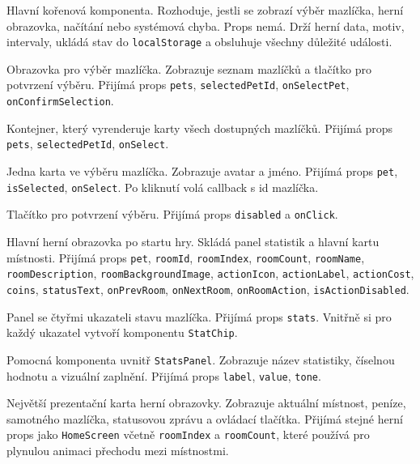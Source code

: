\documentclass[12pt,a4paper]{article}
\begin{document}
\begin{description}[style=nextline]
  \item[\texttt{App}] Hlavní kořenová komponenta. Rozhoduje, jestli se zobrazí výběr mazlíčka, herní obrazovka, načítání nebo systémová chyba. Props nemá. Drží herní data, motiv, intervaly, ukládá stav do \texttt{localStorage} a obsluhuje všechny důležité události.

  \item[\texttt{PetSelectionScreen}] Obrazovka pro výběr mazlíčka. Zobrazuje seznam mazlíčků a tlačítko pro potvrzení výběru. Přijímá props \texttt{pets}, \texttt{selectedPetId}, \texttt{onSelectPet}, \texttt{onConfirmSelection}.

  \item[\texttt{PetSelectionList}] Kontejner, který vyrenderuje karty všech dostupných mazlíčků. Přijímá props \texttt{pets}, \texttt{selectedPetId}, \texttt{onSelect}.

  \item[\texttt{PetOptionCard}] Jedna karta ve výběru mazlíčka. Zobrazuje avatar a jméno. Přijímá props \texttt{pet}, \texttt{isSelected}, \texttt{onSelect}. Po kliknutí volá callback s id mazlíčka.

  \item[\texttt{SelectPetButton}] Tlačítko pro potvrzení výběru. Přijímá props \texttt{disabled} a \texttt{onClick}.

  \item[\texttt{HomeScreen}] Hlavní herní obrazovka po startu hry. Skládá panel statistik a hlavní kartu místnosti. Přijímá props \texttt{pet}, \texttt{roomId}, \texttt{roomIndex}, \texttt{roomCount}, \texttt{roomName}, \texttt{roomDescription}, \texttt{roomBackgroundImage}, \texttt{actionIcon}, \texttt{actionLabel}, \texttt{actionCost}, \texttt{coins}, \texttt{statusText}, \texttt{onPrevRoom}, \texttt{onNextRoom}, \texttt{onRoomAction}, \texttt{isActionDisabled}.

  \item[\texttt{StatsPanel}] Panel se čtyřmi ukazateli stavu mazlíčka. Přijímá props \texttt{stats}. Vnitřně si pro každý ukazatel vytvoří komponentu \texttt{StatChip}.

  \item[\texttt{StatChip}] Pomocná komponenta uvnitř \texttt{StatsPanel}. Zobrazuje název statistiky, číselnou hodnotu a vizuální zaplnění. Přijímá props \texttt{label}, \texttt{value}, \texttt{tone}.

  \item[\texttt{PetCard}] Největší prezentační karta herní obrazovky. Zobrazuje aktuální místnost, peníze, samotného mazlíčka, statusovou zprávu a ovládací tlačítka. Přijímá stejné herní props jako \texttt{HomeScreen} včetně \texttt{roomIndex} a \texttt{roomCount}, které používá pro plynulou animaci přechodu mezi místnostmi.


\end{description}
\end{document}

